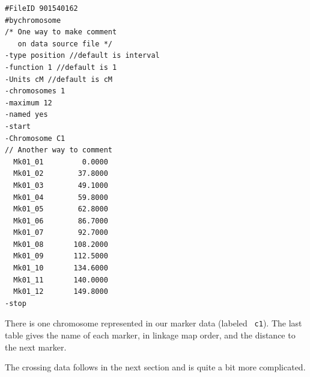 {\small
\begin{verbatim}
#FileID 901540162
#bychromosome
/* One way to make comment
   on data source file */
-type position //default is interval
-function 1 //default is 1
-Units cM //default is cM
-chromosomes 1
-maximum 12 
-named yes
-start
-Chromosome C1
// Another way to comment
  Mk01_01         0.0000
  Mk01_02        37.8000
  Mk01_03        49.1000
  Mk01_04        59.8000
  Mk01_05        62.8000
  Mk01_06        86.7000
  Mk01_07        92.7000
  Mk01_08       108.2000
  Mk01_09       112.5000
  Mk01_10       134.6000
  Mk01_11       140.0000
  Mk01_12       149.8000
-stop

\end{verbatim}
}

There is one chromosome represented in our marker data (labeled {\tt
c1}). The last table gives the name of each marker, in linkage map
order, and the distance to the next marker.

The crossing data follows in the next section and is quite a bit more
complicated.

